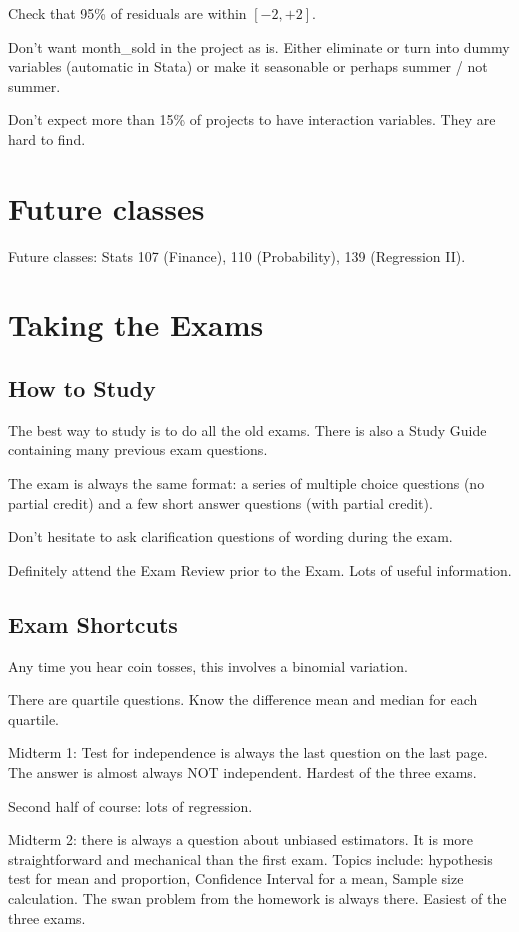 \documentclass[11pt, oneside]{article}   	%
\begin{document}
Check that 95\% of residuals are within $[-2, +2]$.

Don't want month\_sold in the project as is. Either eliminate or turn into dummy variables  (automatic in Stata) or make it seasonable or perhaps summer / not summer.  

Don't expect more than 15\% of projects to have interaction variables. They are hard to find.

\section{Future classes}

Future classes: Stats 107 (Finance), 110 (Probability), 139 (Regression II).


\section{Taking the Exams}
\subsection{How to Study}
The best way to study is to do all the old exams. There is also a Study Guide containing many previous exam questions.

The exam is always the same format: a series of multiple choice questions (no partial credit) and a few short answer questions (with partial credit).

Don't hesitate to ask clarification questions of wording during the exam.

Definitely attend the Exam Review prior to the Exam. Lots of useful information.

\subsection{Exam Shortcuts}

Any time you hear coin tosses, this involves a binomial variation.

There are quartile questions. Know the difference mean and median for each quartile. 

Midterm 1: Test for independence is always the last question on the last page. The answer is almost always NOT independent. Hardest of the three exams.

Second half of course: lots of regression.

Midterm 2: there is always a question about unbiased estimators. It is more straightforward and mechanical than the first exam. Topics include: hypothesis test for mean and proportion, Confidence Interval for a mean, Sample size calculation. The swan problem from the homework is always there. Easiest of the three exams.
\end{document}
